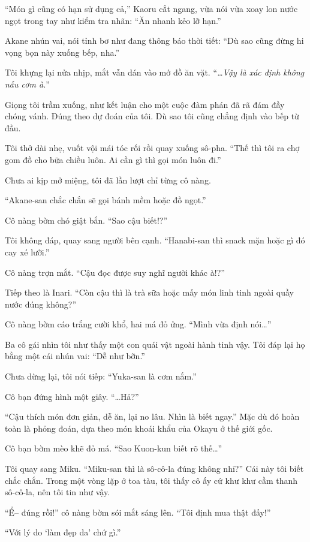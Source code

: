 \documentclass[../main.tex]{subfiles}
\begin{document}
``Món gì cũng có hạn sử dụng cả,'' Kaoru cắt ngang, vừa nói vừa xoay lon nước ngọt trong tay như kiểm tra nhãn: ``Ăn nhanh kẻo lỡ hạn.''

Akane nhún vai, nói tỉnh bơ như đang thông báo thời tiết: ``Dù sao cũng đừng hi vọng bọn này xuống bếp, nha.''

Tôi khựng lại nửa nhịp, mắt vẫn dán vào mớ đồ ăn vặt. ``\textit{\dots Vậy là xác định không nấu cơm à.}''

Giọng tôi trầm xuống, như kết luận cho một cuộc đàm phán đã rã đám đầy chóng vánh. Đúng theo dự đoán của tôi. Dù sao tôi cũng chẳng định vào bếp từ đầu.

Tôi thở dài nhẹ, vuốt vội mái tóc rối rồi quay xuống sô-pha. ``Thế thì tôi ra chợ gom đồ cho bữa chiều luôn. Ai cần gì thì gọi món luôn đi.''

Chưa ai kịp mở miệng, tôi đã lần lượt chỉ từng cô nàng.

``Akane-san chắc chắn sẽ gọi bánh mềm hoặc đồ ngọt.''

Cô nàng bờm chó giật bắn. ``Sao cậu biết!?''

Tôi không đáp, quay sang người bên cạnh. ``Hanabi-san thì snack mặn hoặc gì đó cay xé lưỡi.''

Cô nàng trợn mắt. ``Cậu đọc được suy nghĩ người khác à!?''

Tiếp theo là Inari. ``Còn cậu thì là trà sữa hoặc mấy món linh tinh ngoài quầy nước đúng không?''

Cô nàng bờm cáo trắng cười khổ, hai má đỏ ửng. ``Mình vừa định nói\dots''

Ba cô gái nhìn tôi như thấy một con quái vật ngoài hành tinh vậy. Tôi đáp lại họ bằng một cái nhún vai: ``Dễ như bỡn.''

Chưa dừng lại, tôi nói tiếp: ``Yuka-san là cơm nắm.''

Cô bạn đứng hình một giây. ``\dots Hả?''

``Cậu thích món đơn giản, dễ ăn, lại no lâu. Nhìn là biết ngay.'' Mặc dù đó hoàn toàn là phỏng đoán, dựa theo món khoái khẩu của Okayu ở thế giới gốc.

Cô bạn bờm mèo khẽ đỏ má. ``Sao Kuon-kun biết rõ thế\dots''

Tôi quay sang Miku. ``Miku-san thì là sô-cô-la đúng không nhỉ?'' Cái này tôi biết chắc chắn. Trong một vòng lặp ở toa tàu, tôi thấy cô ấy cứ khư khư cầm thanh sô-cô-la, nên tôi tin như vậy.

``Ể-- đúng rồi!'' cô nàng bờm sói mắt sáng lên. ``Tôi định mua thật đấy!''

``Với lý do `làm đẹp da' chứ gì.''
\end{document}
